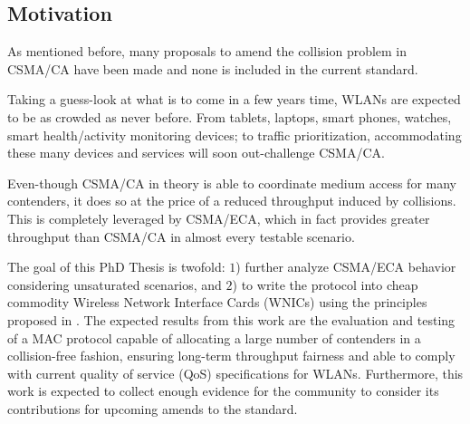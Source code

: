 \subsection{Motivation}
As mentioned before, many proposals to amend the collision problem in CSMA/CA have been made and none is included in the current standard.

Taking a guess-look at what is to come in a few years time, WLANs are expected to be as crowded as never before. From tablets, laptops, smart phones, watches, smart health/activity monitoring devices; to traffic prioritization, accommodating these many devices and services will soon out-challenge CSMA/CA.

Even-though CSMA/CA in theory is able to coordinate medium access for many contenders, it does so at the price of a reduced throughput induced by collisions. This is completely leveraged by CSMA/ECA, which in fact provides greater throughput than CSMA/CA in almost every testable scenario.

The goal of this PhD Thesis is twofold: $1$) further analyze CSMA/ECA behavior considering unsaturated scenarios, and $2$) to write the protocol into cheap commodity Wireless Network Interface Cards (WNICs) using the principles proposed in \cite{WMP}. The expected results from this work are the evaluation and testing of a MAC protocol capable of allocating a large number of contenders in a collision-free fashion, ensuring long-term throughput fairness and able to comply with current quality of service (QoS) specifications for WLANs. Furthermore, this work is expected to collect enough evidence for the community to consider its contributions for upcoming amends to the standard.

